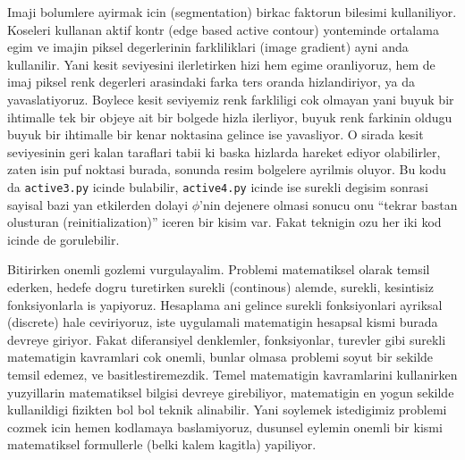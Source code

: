 \documentclass[12pt,fleqn]{article}\usepackage{../common}
\begin{document}
Imaji bolumlere ayirmak icin (segmentation) birkac faktorun bilesimi
kullaniliyor. Koseleri kullanan aktif kontr (edge based active contour)
yonteminde ortalama egim ve imajin piksel degerlerinin farkliliklari (image
gradient) ayni anda kullanilir. Yani kesit seviyesini ilerletirken hizi hem
egime oranliyoruz, hem de imaj piksel renk degerleri arasindaki farka ters
oranda hizlandiriyor, ya da yavaslatiyoruz. Boylece kesit seviyemiz renk
farkliligi cok olmayan yani buyuk bir ihtimalle tek bir objeye ait bir
bolgede hizla ilerliyor, buyuk renk farkinin oldugu buyuk bir ihtimalle bir
kenar noktasina gelince ise yavasliyor. O sirada kesit seviyesinin geri
kalan taraflari tabii ki baska hizlarda hareket ediyor olabilirler, zaten
isin puf noktasi burada, sonunda resim bolgelere ayrilmis oluyor. Bu kodu
da \verb!active3.py! icinde bulabilir, \verb!active4.py! icinde ise surekli
degisim sonrasi sayisal bazi yan etkilerden dolayi $\phi$'nin dejenere
olmasi sonucu onu ``tekrar bastan olusturan (reinitialization)'' iceren bir
kisim var. Fakat teknigin ozu her iki kod icinde de gorulebilir.

Bitirirken onemli gozlemi vurgulayalim. Problemi matematiksel olarak temsil
ederken, hedefe dogru turetirken surekli (continous) alemde, surekli,
kesintisiz fonksiyonlarla is yapiyoruz. Hesaplama ani gelince surekli
fonksiyonlari ayriksal (discrete) hale ceviriyoruz, iste uygulamali
matematigin hesapsal kismi burada devreye giriyor. Fakat diferansiyel
denklemler, fonksiyonlar, turevler gibi surekli matematigin kavramlari cok
onemli, bunlar olmasa problemi soyut bir sekilde temsil edemez, ve
basitlestiremezdik. Temel matematigin kavramlarini kullanirken yuzyillarin
matematiksel bilgisi devreye girebiliyor, matematigin en yogun sekilde
kullanildigi fizikten bol bol teknik alinabilir. Yani soylemek istedigimiz
problemi cozmek icin hemen kodlamaya baslamiyoruz, dusunsel eylemin onemli
bir kismi matematiksel formullerle (belki kalem kagitla) yapiliyor.







\begin{figure}[!hbp]
\caption{}
\end{figure}
\end{document}
